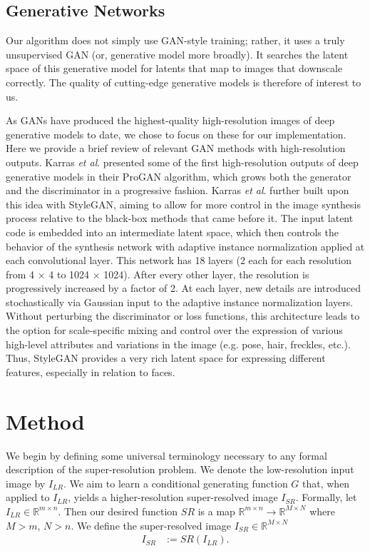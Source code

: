 \documentclass[10pt,twocolumn,letterpaper]{article}
\begin{document}
\subsection{Generative Networks}

Our algorithm does not simply use GAN-style training; rather, it uses a truly unsupervised GAN (or, generative model more broadly). It searches the latent space of this generative model for latents that map to images that downscale correctly. The quality of cutting-edge generative models is therefore of interest to us. 


As GANs have produced the highest-quality high-resolution images of deep generative models to date, we chose to focus on these for our implementation. Here we provide a brief review of relevant GAN methods with high-resolution outputs. Karras \textit{et al}. \cite{karras2017progressive} presented some of the first high-resolution outputs of deep generative models in their ProGAN algorithm, which grows both the generator and the discriminator in a progressive fashion. Karras \textit{et al}. \cite{karras2019style} further built upon this idea with StyleGAN, aiming to allow for more control in the image synthesis process relative to the black-box methods that came before it. The input latent code is embedded into an intermediate latent space, which then controls the behavior of the synthesis network with adaptive instance normalization applied at each convolutional layer. This network has 18 layers (2 each for each resolution from 4 $\times$ 4 to 1024 $\times$ 1024). After every other layer, the resolution is progressively increased by a factor of 2. At each layer, new details are introduced stochastically via Gaussian input to the adaptive instance normalization layers. Without perturbing the discriminator or loss functions, this architecture leads to the option for scale-specific mixing and control over the expression of various high-level attributes and variations in the image (e.g. pose, hair, freckles, etc.). Thus, StyleGAN provides a very rich latent space for expressing different features, especially in relation to faces. 








\section{Method}
We begin by defining some universal terminology necessary to any formal description of the super-resolution problem. We denote the low-resolution input image by $I_{LR}$. 
We aim to learn a conditional generating function $G$ that, when applied to $I_{LR}$, yields a higher-resolution super-resolved image $I_{SR}$. Formally, let $I_{LR} \in \mathbb{R}^{m \times n}$. Then our desired function $SR$ is a map $\mathbb{R}^{m \times n} \rightarrow \mathbb{R}^{M \times N}$ where $M > m$, $N > n$. We define the super-resolved image $I_{SR} \in \mathbb{R}^{M \times N}$
\begin{align}
    I_{SR} &:= SR(I_{LR}).
\end{align}
\end{document}
